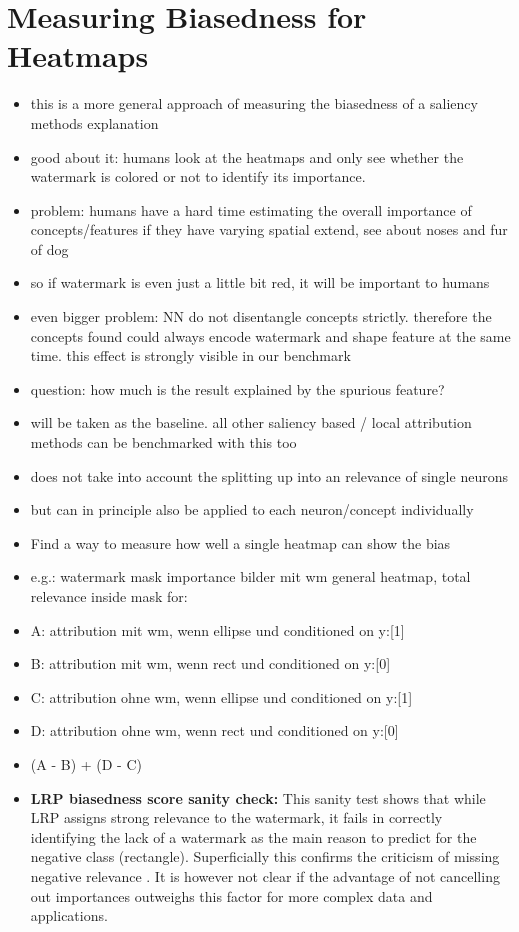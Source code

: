 \section{Measuring Biasedness for Heatmaps}
\begin{itemize}
    \item this is a more general approach of measuring the biasedness of a saliency methods explanation
    \item good about it: humans look at the heatmaps and only see whether the watermark is colored or not to identify its importance. 
    \item problem: humans have a hard time estimating the overall importance of concepts/features if they have varying spatial extend, see \cite{Achtibat2022} about noses and fur of dog
    \item so if watermark is even just a little bit red, it will be important to humans
    \item even bigger problem: NN do not disentangle concepts strictly. therefore the concepts found could always encode watermark and shape feature at the same time. this effect is strongly visible in our benchmark 
    \item question: how much is the result explained by the spurious feature?
    \item will be taken as the baseline. all other saliency based / local attribution methods can be benchmarked with this too
    \item does not take into account the splitting up into an relevance of single neurons
    \item but can in principle also be applied to each neuron/concept individually
    \item Find a way to measure how well a single heatmap can show the bias
    \item e.g.: watermark mask importance bilder mit wm general heatmap, total relevance inside mask for:
    \item A: attribution mit wm, wenn ellipse und conditioned on y:[1]
    \item B: attribution mit wm, wenn rect    und conditioned on y:[0]
    \item C: attribution ohne wm, wenn ellipse und conditioned on y:[1]
    \item D: attribution ohne wm, wenn rect    und conditioned on y:[0]
    \item (A - B) + (D - C)
    \item \textbf{LRP biasedness score sanity check:} 
    This sanity test shows that while LRP assigns strong relevance to the watermark, it fails in correctly identifying the lack of a watermark as the main reason to predict for the negative class (rectangle). Superficially this confirms the criticism of missing negative relevance \cite{Sixt2020}. It is however not clear if the advantage of not cancelling out importances outweighs this factor for more complex data and applications.  

    
\end{itemize}

